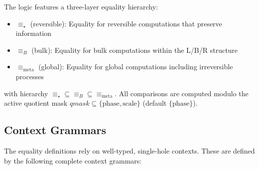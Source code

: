 \begin{definition}
\label{def:equality-hierarchy}
The logic features a three-layer equality hierarchy:
\begin{itemize}
\item $\equiv_\star$ (reversible): Equality for reversible computations that preserve information
\item $\equiv_B$ (bulk): Equality for bulk computations within the L/B/R structure  
\item $\equiv_{\text{meta}}$ (global): Equality for global computations including irreversible processes
\end{itemize}
with hierarchy $\equiv_\star \subseteq \equiv_B \subseteq \equiv_{\text{meta}}$. All comparisons are computed modulo the active quotient mask $qmask \subseteq \{\text{phase}, \text{scale}\}$ (default $\{\text{phase}\}$).
\end{definition}

\subsection{Context Grammars}

The equality definitions rely on well-typed, single-hole contexts. These are defined by the following complete context grammars:

